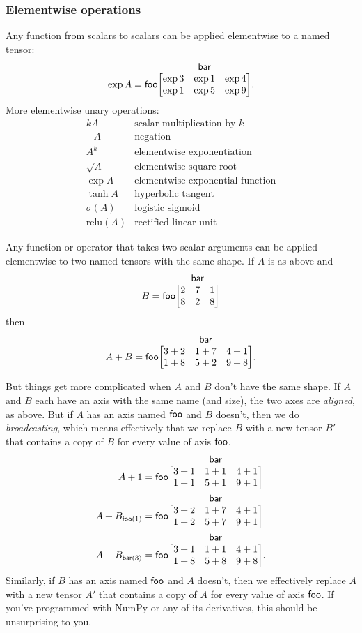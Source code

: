 \documentclass{article}
\makeatletter
\newcommand{\nmatrix}[3]{\name{#1}\begin{array}[b]{@{}c@{}}\name{#2}\\\begin{bmatrix}#3\end{bmatrix}\end{array}}
\makeatother
\begin{document}
\subsubsection{Elementwise operations}
\label{sec:elementwise}

Any function from scalars to scalars can be applied elementwise to a named tensor:
\begin{equation*}
\exp A = \nmatrix{foo}{bar}{
  \exp 3 & \exp 1 & \exp 4 \\
  \exp 1 & \exp 5 & \exp 9
}.
\end{equation*}
More elementwise unary operations:
\[\begin{array}{cl}
kA & \text{scalar multiplication by $k$} \\
-A & \text{negation} \\
A^k & \text{elementwise exponentiation} \\
\sqrt{A} &\text{elementwise square root} \\
\exp A & \text{elementwise exponential function} \\
\tanh A & \text{hyperbolic tangent} \\
\sigma(A) & \text{logistic sigmoid} \\
\text{relu}(A) & \text{rectified linear unit}
\end{array}\]

Any function or operator that takes two scalar arguments can be applied elementwise to two named tensors with the same shape. If $A$ is as above and
\begin{equation*}
B = \nmatrix{foo}{bar}{
  2 & 7 & 1 \\
  8 & 2 & 8
}
\end{equation*}
then
\begin{equation*}
A + B = \nmatrix{foo}{bar}{
  3+2 & 1+7 & 4+1 \\
  1+8 & 5+2 & 9+8
}.
\end{equation*}

But things get more complicated when $A$ and $B$ don't have the same shape. If $A$ and $B$ each have an axis with the same name (and size), the two axes are \emph{aligned}, as above. But if $A$ has an axis named $\mathsf{foo}$ and $B$ doesn't, then we do \emph{broadcasting}, which means effectively that we replace $B$ with a new tensor $B'$ that contains a copy of $B$ for every value of axis $\mathsf{foo}$.
\begin{align*}
A + 1 &= \nmatrix{foo}{bar}{
  3+1 & 1+1 & 4+1 \\
  1+1 & 5+1 & 9+1
} \\
A + B_{\nidx{foo}{1}} &= \nmatrix{foo}{bar}{
  3+2 & 1+7 & 4+1 \\
  1+2 & 5+7 & 9+1
} \\
A + B_{\nidx{bar}{3}} &= \nmatrix{foo}{bar}{
  3+1 & 1+1 & 4+1 \\
  1+8 & 5+8 & 9+8
}.
\end{align*}
Similarly, if $B$ has an axis named $\mathsf{foo}$ and $A$ doesn't, then we effectively replace $A$ with a new tensor $A'$ that contains a copy of $A$ for every value of axis $\mathsf{foo}$. If you've programmed with NumPy or any of its derivatives, this should be unsurprising to you.
\end{document}
